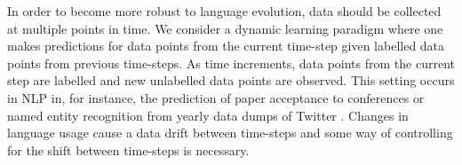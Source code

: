 \documentclass[letterpaper]{article} %
\begin{document}
In order to become more robust to language evolution, data should be collected at multiple points in time. We consider a dynamic learning paradigm where one makes predictions for data points from the current time-step given labelled data points from previous time-steps. As time increments, data points from the current step are labelled and new unlabelled data points are observed. This setting occurs in NLP in, for instance, the prediction of paper acceptance to conferences \cite{kang18naacl} or named entity recognition from yearly data dumps of Twitter \cite{derczynski:2016}. Changes in language usage cause a data drift between time-steps and some way of controlling for the shift between time-steps is necessary. 

\end{document}
